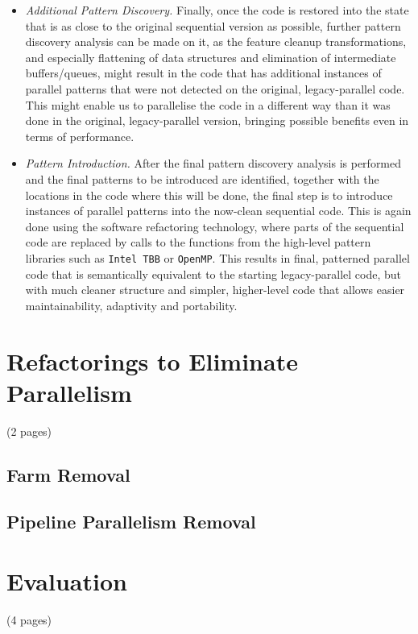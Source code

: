 \documentclass[runningheads]{llncs}
\begin{document}
\begin{itemize}
\item \emph{Additional Pattern Discovery.} Finally, once the code is restored into the state that is as close to the original sequential version as possible, further pattern discovery analysis can be made on it, as the feature cleanup transformations, and especially flattening of data structures and elimination of intermediate buffers/queues, might result in the code that has additional instances of parallel patterns that were not detected on the original, legacy-parallel code. This might enable us to parallelise the code in a different way than it was done in the original, legacy-parallel version, bringing possible benefits even in terms of performance.

\item \emph{Pattern Introduction.} After the final pattern discovery analysis is performed and the final patterns to be introduced are identified, together with the locations in the code where this will be done, the final step is to introduce instances of parallel patterns into the now-clean sequential code. This is again done using the software refactoring technology, where parts of the sequential code are replaced by calls to the functions from the high-level pattern libraries such as \lstinline{Intel TBB} or \lstinline{OpenMP}. This results in final, patterned parallel code that is semantically equivalent to the starting legacy-parallel code, but with much cleaner structure and simpler, higher-level code that allows easier maintainability, adaptivity and portability.
\end{itemize}

\section{Refactorings to Eliminate Parallelism} (2 pages)
\subsection{Farm Removal}
\subsection{Pipeline Parallelism Removal}

\section{Evaluation} (4 pages)
\end{document}
